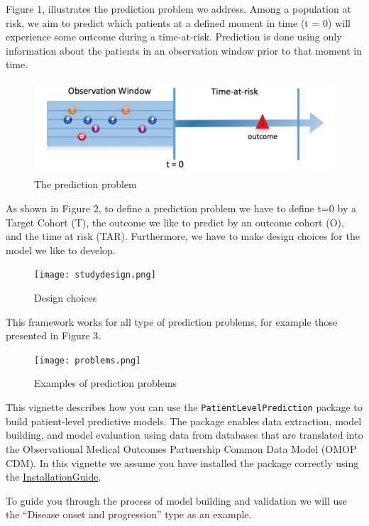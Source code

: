 \documentclass[]{article}
\begin{document}
Figure 1, illustrates the prediction problem we address. Among a
population at risk, we aim to predict which patients at a defined moment
in time (t = 0) will experience some outcome during a time-at-risk.
Prediction is done using only information about the patients in an
observation window prior to that moment in time.

\begin{figure}
\centering
\includegraphics{Figure1.png}
\caption{The prediction problem}
\end{figure}

As shown in Figure 2, to define a prediction problem we have to define
t=0 by a Target Cohort (T), the outcome we like to predict by an outcome
cohort (O), and the time at risk (TAR). Furthermore, we have to make
design choices for the model we like to develop.

\begin{figure}
\centering
\texttt{[image: studydesign.png]}
\caption{Design choices}
\end{figure}

This framework works for all type of prediction problems, for example
those presented in Figure 3.

\begin{figure}
\centering
\texttt{[image: problems.png]}
\caption{Examples of prediction problems}
\end{figure}

This vignette describes how you can use the
\texttt{PatientLevelPrediction} package to build patient-level
predictive models. The package enables data extraction, model building,
and model evaluation using data from databases that are translated into
the Observational Medical Outcomes Partnership Common Data Model (OMOP
CDM). In this vignette we assume you have installed the package
correctly using the
\href{https://github.com/OHDSI/PatientLevelPrediction/blob/master/inst/doc/InstallationGuide.pdf}{InstallationGuide}.

To guide you through the process of model building and validation we
will use the ``Disease onset and progression'' type as an example.
\end{document}
